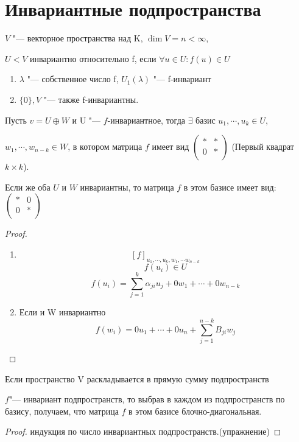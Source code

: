 \section{Инвариантные подпространства}
\begin{Def}

$V$ "--- векторное пространства над K, $\dim V = n < \infty$,

$U < V$ инвариантно относительно f, если  $\forall u \in U \colon f(u) \in U$

\end{Def}

\begin{exmp}

\begin{enumerate}
\item 
$\lambda$ "--- собственное число f, $U_1(\lambda)$ "--- f-инвариант

\item 
$\{0\}, V$ "--- также f-инвариантны. 
\end{enumerate}
\end{exmp} 

\begin{theorem}{}
Пусть $v = U \oplus W$ и U "--- $f$-инвариантное, тогда
$\exists$ базис $u_1, \cdots, u_k \in U$, 

$w_1, \cdots, w_{n - k} \in W$, в котором матрица $f$
имеет вид 
$\begin{pmatrix}
*&*\\
0&*\\
\end{pmatrix}$
(Первый квадрат $k \times k$).

Если же оба $U$ и $W$ инвариантны, то матрица $f$ в этом базисе имеет вид:
$
\begin{pmatrix}
*&0\\
0&*\\
\end{pmatrix}
$
\end{theorem}
\begin{proof}
\begin{enumerate}
    \item
     $$[f]_{u_1, \cdots,u_k, w_1, \cdots w_{n - k}}$$
     $$f(u_i) \in U$$
     $$f(u_i) = \sum_{j = 1}^{k} \alpha_{ji}u_j + 0w_1 + \cdots + 0w_{n - k}$$
     \item Если и W инвариантно
     $$f(w_i) = 0u_1 + \cdots + 0u_n + \sum_{j = 1}^{n - k}B_{ji}w_j$$
\end{enumerate}
\end{proof}
\begin{conseq}
Если пространство V раскладывается в прямую сумму подпространств

$f$"--- инвариант подпространств, то выбрав в каждом из
подпространств по базису, получаем, что матрица $f$ в этом
базисе блочно-диагональная.
\end{conseq}
\begin{proof}
индукция по число инвариантных подпространств.(упражнение)
\end{proof}

